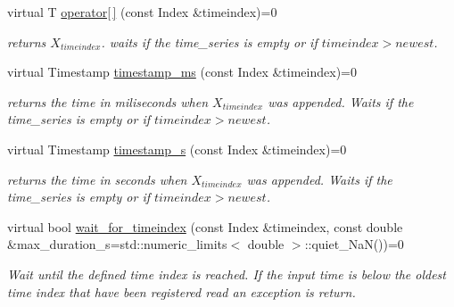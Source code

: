 \begin{DoxyCompactItemize}
\mbox{\label{classtime__series_1_1TimeSeriesInterface_a3149f64961e08315eb06798d0f075333}} 
virtual T \hyperlink{classtime__series_1_1TimeSeriesInterface_a3149f64961e08315eb06798d0f075333}{operator\mbox{[}$\,$\mbox{]}} (const Index \&timeindex)=0
\begin{DoxyCompactList}\small\item\em returns $ X_{timeindex} $. waits if the time\+\_\+series is empty or if $timeindex > newest $. \end{DoxyCompactList}\item 
\mbox{\label{classtime__series_1_1TimeSeriesInterface_aaeb745c8c13170a645b25170f0b035f1}} 
virtual Timestamp \hyperlink{classtime__series_1_1TimeSeriesInterface_aaeb745c8c13170a645b25170f0b035f1}{timestamp\+\_\+ms} (const Index \&timeindex)=0
\begin{DoxyCompactList}\small\item\em returns the time in miliseconds when $ X_{timeindex} $ was appended. Waits if the time\+\_\+series is empty or if $timeindex > newest $. \end{DoxyCompactList}\item 
\mbox{\label{classtime__series_1_1TimeSeriesInterface_acfb468e6e1766fe4b566189d3b888e4d}} 
virtual Timestamp \hyperlink{classtime__series_1_1TimeSeriesInterface_acfb468e6e1766fe4b566189d3b888e4d}{timestamp\+\_\+s} (const Index \&timeindex)=0
\begin{DoxyCompactList}\small\item\em returns the time in seconds when $ X_{timeindex} $ was appended. Waits if the time\+\_\+series is empty or if $timeindex > newest $. \end{DoxyCompactList}\item 
\mbox{\label{classtime__series_1_1TimeSeriesInterface_aa09c55259a1f34491b5ecdd1505ffdbf}} 
virtual bool \hyperlink{classtime__series_1_1TimeSeriesInterface_aa09c55259a1f34491b5ecdd1505ffdbf}{wait\+\_\+for\+\_\+timeindex} (const Index \&timeindex, const double \&max\+\_\+duration\+\_\+s=std\+::numeric\+\_\+limits$<$ double $>$\+::quiet\+\_\+\+NaN())=0
\begin{DoxyCompactList}\small\item\em Wait until the defined time index is reached. If the input time is below the oldest time index that have been registered read an exception is return. \end{DoxyCompactList}\item 

\end{DoxyCompactItemize}
